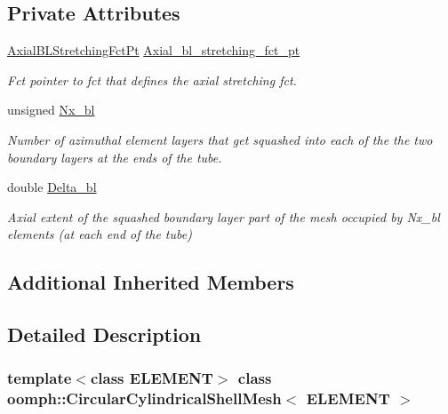 \subsection*{Private Attributes}
\begin{DoxyCompactItemize}
\item 
\hyperlink{classoomph_1_1CircularCylindricalShellMesh_a770336fa72e8911f31b9fe3f70197a51}{Axial\+B\+L\+Stretching\+Fct\+Pt} \hyperlink{classoomph_1_1CircularCylindricalShellMesh_a5669a7c088fe0d30f7d011275861f6b9}{Axial\+\_\+bl\+\_\+stretching\+\_\+fct\+\_\+pt}
\begin{DoxyCompactList}\small\item\em Fct pointer to fct that defines the axial stretching fct. \end{DoxyCompactList}\item 
unsigned \hyperlink{classoomph_1_1CircularCylindricalShellMesh_a1a7ed3a5cd4c03c6254e5a8a0d3e532a}{Nx\+\_\+bl}
\begin{DoxyCompactList}\small\item\em Number of azimuthal element layers that get squashed into each of the the two boundary layers at the ends of the tube. \end{DoxyCompactList}\item 
double \hyperlink{classoomph_1_1CircularCylindricalShellMesh_a935925bc28901cf99f2ebdc2cff1b692}{Delta\+\_\+bl}
\begin{DoxyCompactList}\small\item\em Axial extent of the squashed boundary layer part of the mesh occupied by Nx\+\_\+bl elements (at each end of the tube) \end{DoxyCompactList}\end{DoxyCompactItemize}
\subsection*{Additional Inherited Members}


\subsection{Detailed Description}
\subsubsection*{template$<$class E\+L\+E\+M\+E\+NT$>$\newline
class oomph\+::\+Circular\+Cylindrical\+Shell\+Mesh$<$ E\+L\+E\+M\+E\+N\+T $>$}

